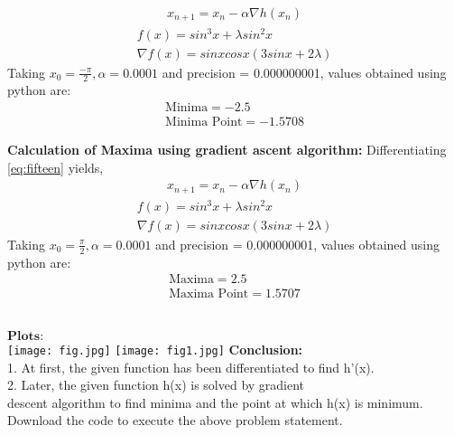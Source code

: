 \documentclass[10pt,a4paper]{report}
\let\vec\mathbf
\let\vec\mathbf
\begin{document}
\begin{multicols}{2}
\begin{align}
       \boxed{x_{n+1} = x_n - \alpha \nabla h(x_n)} 
\end{align}
\begin{align}
\label{eq:ten}
f(x)= sin^3 x+\lambda sin^2 x \\ 
\nabla f(x) = sinx cosx (3sinx+2\lambda)
\end{align}
\vspace{1mm}
Taking $x_0=\frac{-\pi}{2},\alpha=0.0001$ and precision = 0.000000001, values obtained using python are:
    \begin{align}
        \boxed{\text{Minima} =-2.5}\\     
        \boxed{\text{Minima Point} = -1.5708}
    \end{align}
   
\textbf{Calculation of Maxima using gradient ascent algorithm:}
Differentiating \eqref{eq:fifteen} yields,
\begin{align}
       \boxed{x_{n+1} = x_n - \alpha \nabla h(x_n)} 
\end{align}
\begin{align}
\label{eq:fifteen}
f(x)= sin^3 x+\lambda sin^2 x \\ 
\nabla f(x) = sinx cosx (3sinx+2\lambda)
\end{align}
\vspace{1mm}
Taking $x_0=\frac{\pi}{2},\alpha=0.0001$ and precision = 0.000000001, values obtained using python are:
    \begin{align}
        \boxed{\text{Maxima} =2.5}\\     
        \boxed{\text{Maxima Point} = 1.5707}
    \end{align}
\vspace{2mm} 
\\
\raggedright $\vec{Plots:}$ \\
\texttt{[image: fig.jpg]}
\label{fig:Figure}
\texttt{[image: fig1.jpg]}
\label{fig:Figure}
\textbf{Conclusion:}\\
1. At first, the given function has been differentiated to find h'(x).
\\
2. Later, the given function h(x) is solved by gradient   \\descent algorithm to find minima and the point at which h(x) is minimum.
Download the code to execute the above problem statement.
\vspace{4mm}
\\
\end{multicols}
\end{document}
